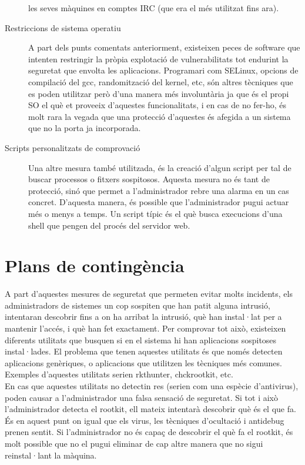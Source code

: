 \begin{description}
        les seves màquines en comptes IRC (que era el més utilitzat fins ara).
    \item[Restriccions de sistema operatiu] A part dels punts comentats anteriorment, existeixen peces de 
        software que intenten restringir la pròpia explotació de vulnerabilitats tot endurint la seguretat que 
        envolta les aplicacions. Programari com SELinux, opcions de compilació del gcc, randomització del kernel, 
        etc, són altres tècniques que es poden utilitzar però d'una manera més involuntària ja que és 
        el propi SO el què et proveeix d'aquestes funcionalitats, i en cas de no fer-ho, és molt rara la vegada
        que una protecció d'aquestes és afegida a un sistema que no la porta ja incorporada.
    \item[Scripts personalitzats de comprovació] Una altre mesura també utilitzada, és la creació d'algun script per tal de 
        buscar processos o fitxers sospitosos. Aquesta mesura no és tant de protecció, sinó que 
        permet a l'administrador rebre una alarma en un cas concret. D'aquesta manera, és possible que 
		l'administrador pugui actuar més o menys a temps. Un script típic és el què busca execucions d'una 
		shell que pengen del procés del servidor web.
\end{description}

\section{Plans de contingència}

A part d'aquestes mesures de seguretat que permeten evitar molts incidents, els administradors de sistemes un cop
sospiten que han patit alguna intrusió, intentaran descobrir fins a on ha arribat la intrusió, què han instal·lat 
per a mantenir l'accés, i què han fet exactament. Per comprovar tot això, existeixen diferents utilitats que busquen si en 
el sistema hi han aplicacions sospitoses instal·lades. El problema que tenen aquestes utilitats és que només detecten
aplicacions genèriques, o aplicacions que utilitzen les tècniques més comunes. Exemples d'aquestes utilitats serien 
rkthunter, chckrootkit, etc. \\

En cas que aquestes utilitats no detectin res (serien com una espècie d'antivirus), poden causar a l'administrador
una falsa sensació de seguretat. Si tot i això l'administrador detecta el rootkit, ell mateix intentarà descobrir 
què és el que fa. És en aquest punt on igual  que els virus, les tècniques d'ocultació i antidebug prenen sentit.
Si l'administrador no és capaç de descobrir el què fa el rootkit, és molt possible que no el pugui eliminar de cap
altre manera que no sigui reinstal·lant la màquina. \\

